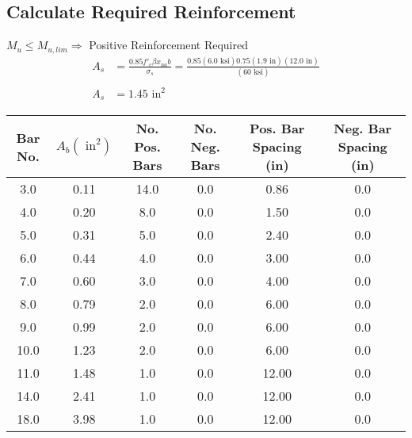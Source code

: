 \documentclass{article}%
\begin{document}
\subsection{Calculate Required Reinforcement}%
\label{subsec:Calculate Required Reinforcement}%
$M_u \leq M_{u,lim} \Rightarrow$ Positive Reinforcement Required%
\begin{align*}A_s &= \frac{0.85 f'_c \beta x_{na} b}{\sigma_s} =\frac{0.85 (6.0 \text{ ksi}) 0.75 (1.9  \text{ in})(12.0 \text{ in})}{(60 \text{ ksi})} \\\\A_s &= 1.45 \text{ in}^2\end{align*}%
\begin{center}
%
\begin{tabular}{cccccc}
\toprule
 Bar No. &  $A_b({\text{ in}}^2)$ &  No. Pos. Bars &  No. Neg. Bars &  Pos. Bar Spacing (in) &  Neg. Bar Spacing (in) \\
\midrule
     3.0 &                   0.11 &           14.0 &            0.0 &                   0.86 &                    0.0 \\
     4.0 &                   0.20 &            8.0 &            0.0 &                   1.50 &                    0.0 \\
     5.0 &                   0.31 &            5.0 &            0.0 &                   2.40 &                    0.0 \\
     6.0 &                   0.44 &            4.0 &            0.0 &                   3.00 &                    0.0 \\
     7.0 &                   0.60 &            3.0 &            0.0 &                   4.00 &                    0.0 \\
     8.0 &                   0.79 &            2.0 &            0.0 &                   6.00 &                    0.0 \\
     9.0 &                   0.99 &            2.0 &            0.0 &                   6.00 &                    0.0 \\
    10.0 &                   1.23 &            2.0 &            0.0 &                   6.00 &                    0.0 \\
    11.0 &                   1.48 &            1.0 &            0.0 &                  12.00 &                    0.0 \\
    14.0 &                   2.41 &            1.0 &            0.0 &                  12.00 &                    0.0 \\
    18.0 &                   3.98 &            1.0 &            0.0 &                  12.00 &                    0.0 \\
\bottomrule
\end{tabular}
%
\end{center}

%
\end{document}
